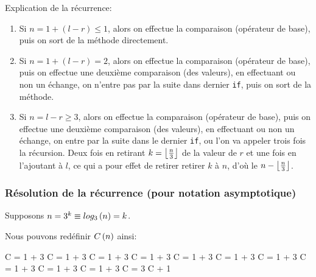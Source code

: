 \documentclass[class=article]{standalone}
\begin{document}
Explication de la récurrence:
\begin{enumerate}
    \item Si $n = 1+(l-r) \leq 1$, alors on effectue la comparaison (opérateur de base), 
    puis on sort de la méthode directement.
    \item Si $n = 1+(l-r) = 2$, alors on effectue la comparaison (opérateur de base), 
    puis on effectue une deuxième comparaison (des valeurs), en effectuant ou non 
    un échange, on n'entre pas par la suite dans dernier \lstinline{if}, puis on sort de la méthode.
    \item Si $n = l-r \geq 3$, alors on effectue la comparaison (opérateur de base),
    puis on effectue une deuxième comparaison (des valeurs), en effectuant ou non 
    un échange, on entre par la suite dans le dernier \lstinline{if}, ou l'on
    va appeler trois fois la récursion. Deux fois en retirant $k = \left \lfloor \frac{n}{3} \right \rfloor$ 
    de la valeur de $r$ et une fois en l'ajoutant à $l$, ce qui a pour effet de 
    retirer retirer $k$ à $n$, d'où le $n-\left \lfloor \frac{n}{3} \right \rfloor$.
\end{enumerate}

\subsubsection*{Résolution de la récurrence (pour notation asymptotique)}
Supposons $n = 3^k \equiv log_{3}\left ( n \right ) = k$.

Nous pouvons redéfinir $C\left ( n \right )$ ainsi:

\begin{deriv}
    C
    \<= 
    1 + 3 \cdot C
    \<= 
    1 + 3 \cdot C
    \<= 
    1 + 3 \cdot C
    \<= 
    1 + 3 \cdot C
    \<= 
    1 + 3 \cdot C
    \<= 
    1 + 3 \cdot C
    \<= 
    1 + 3 \cdot C
    \<= 
    1 + 3 \cdot C
    \<= 
    1 + 3 \cdot C
    \<= 
    1 + 3 \cdot C
    \<= 
    3 \cdot C + 1
    \<\in
    \Theta{}
    \<\simeq
    \Theta{}
\end{deriv}
\end{document}
